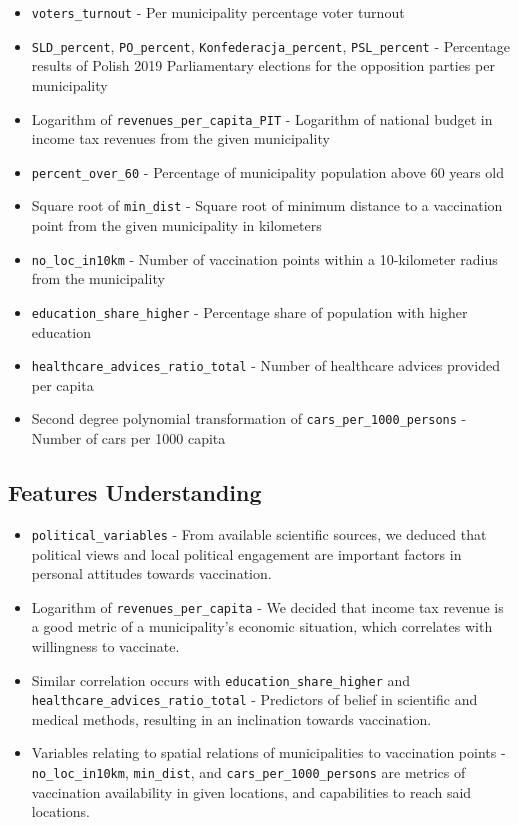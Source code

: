 \documentclass[a4paper,12pt]{article} %
\begin{document}
\begin{itemize}
    \item \texttt{voters\_turnout} - Per municipality percentage voter turnout
    \item \texttt{SLD\_percent}, \texttt{PO\_percent}, \texttt{Konfederacja\_percent}, \texttt{PSL\_percent} - Percentage results of Polish 2019 Parliamentary elections for the opposition parties per municipality
    \item Logarithm of \texttt{revenues\_per\_capita\_PIT} - Logarithm of national budget in income tax revenues from the given municipality
    \item \texttt{percent\_over\_60} - Percentage of municipality population above 60 years old
    \item Square root of \texttt{min\_dist} - Square root of minimum distance to a vaccination point from the given municipality in kilometers
    \item \texttt{no\_loc\_in10km} - Number of vaccination points within a 10-kilometer radius from the municipality
    \item \texttt{education\_share\_higher} - Percentage share of population with higher education
    \item \texttt{healthcare\_advices\_ratio\_total} - Number of healthcare advices provided per capita
    \item Second degree polynomial transformation of \texttt{cars\_per\_1000\_persons} - Number of cars per 1000 capita
\end{itemize}

\subsection{Features Understanding}

\begin{itemize}
    \item \texttt{political\_variables} - From available scientific sources, we deduced that political views and local political engagement are important factors in personal attitudes towards vaccination.
    \item Logarithm of \texttt{revenues\_per\_capita} - We decided that income tax revenue is a good metric of a municipality's economic situation, which correlates with willingness to vaccinate.
    \item Similar correlation occurs with \texttt{education\_share\_higher} and\\ \texttt{healthcare\_advices\_ratio\_total} - Predictors of belief in scientific and medical methods, resulting in an inclination towards vaccination.
    \item Variables relating to spatial relations of municipalities to vaccination points - \texttt{no\_loc\_in10km}, \texttt{min\_dist}, and \texttt{cars\_per\_1000\_persons} are metrics of vaccination availability in given locations, and capabilities to reach said locations.
\end{itemize}
\end{document}
